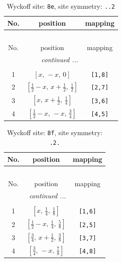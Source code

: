 \documentclass[fleqn,8pt]{jsarticle}
\begin{document}
\renewcommand{\arraystretch}{1.2}
\begin{longtable}{ccc}
\caption{Wyckoff site: {\tt 8e}, site symmetry: {\tt ..2}}
 \\
 \hline \hline
No. & position & mapping \\ \hline \endfirsthead

\multicolumn{2}{l}{\tablename\ \thetable{}} \\
 \hline \hline
No. & position & mapping \\ \hline \endhead

 \hline \hline
\multicolumn{2}{r}{\footnotesize\it continued ...} \\ \endfoot

 \hline \hline
\multicolumn{2}{r}{} \\ \endlastfoot

1 & $\left[ x,\, - x,\, 0 \right]$ & {\tt [1,8]} \\ \hline
2 & $\left[ \frac{1}{2} - x,\, x + \frac{1}{2},\, \frac{1}{2} \right]$ & {\tt [2,7]} \\ \hline
3 & $\left[ x,\, x + \frac{1}{2},\, \frac{1}{4} \right]$ & {\tt [3,6]} \\ \hline
4 & $\left[ \frac{1}{2} - x,\, - x,\, \frac{3}{4} \right]$ & {\tt [4,5]} \\
\end{longtable}
\renewcommand{\arraystretch}{1.2}
\begin{longtable}{ccc}
\caption{Wyckoff site: {\tt 8f}, site symmetry: {\tt .2.}}
 \\
 \hline \hline
No. & position & mapping \\ \hline \endfirsthead

\multicolumn{2}{l}{\tablename\ \thetable{}} \\
 \hline \hline
No. & position & mapping \\ \hline \endhead

 \hline \hline
\multicolumn{2}{r}{\footnotesize\it continued ...} \\ \endfoot

 \hline \hline
\multicolumn{2}{r}{} \\ \endlastfoot

1 & $\left[ x,\, \frac{1}{4},\, \frac{1}{8} \right]$ & {\tt [1,6]} \\ \hline
2 & $\left[ \frac{1}{2} - x,\, \frac{1}{4},\, \frac{5}{8} \right]$ & {\tt [2,5]} \\ \hline
3 & $\left[ \frac{3}{4},\, x + \frac{1}{2},\, \frac{3}{8} \right]$ & {\tt [3,7]} \\ \hline
4 & $\left[ \frac{3}{4},\, - x,\, \frac{7}{8} \right]$ & {\tt [4,8]} \\
\end{longtable}
\end{document}
